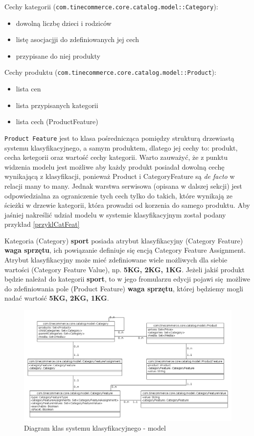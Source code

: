 \noindent Cechy kategorii (\texttt{com.tinecommerce.core.catalog.model::Category}):
\begin{itemize}
	\item dowolną liczbę dzieci i rodziców
	\item listę asocjacjji do zdefiniowanych jej cech
	\item przypisane do niej produkty
\end{itemize} 
Cechy produktu (\texttt{com.tinecommerce.core.catalog.model::Product}):
\begin{itemize}
	\item lista cen
	\item lista przypisanych kategorii
	\item lista cech (ProductFeature)
\end{itemize}
\texttt{Product Feature} jest to klasa pośrednicząca pomiędzy strukturą drzewiastą systemu klasyfikacyjnego, a samym produktem, dlatego jej cechy to: produkt, cecha ketegorii oraz wartość cechy kategorii. Warto zauważyć, że z punktu widzenia modelu jest możliwe aby każdy produkt posiadał dowolną cechę wynikającą z klasyfikacji, ponieważ Product i CategoryFeature są  \textit{de facto} w relacji many to many. Jednak warstwa serwisowa (opisana w dalszej sekcji) jest odpowiedzialna za ograniczenie tych cech tylko do takich, które wynikają ze ścieżki w drzewie kategorii, która prowadzi od korzenia do samego produktu. Aby jaśniej nakreślić udział modelu w systemie klasyfikacyjnym został podany przykład \ref{przyklCatFeat}
\begin{example}
	\label{przyklCatFeat}
	Kategoria (Category) \textbf{sport} posiada atrybut klasyfikacyjny (Category Feature) \textbf{waga sprzętu}, ich powiązanie definiuje się encją Category Feature Assignment. Atrybut klasyfikacyjny może mieć zdefiniowane wiele możliwych dla siebie wartości (Category Feature Value), np. \textbf{5KG, 2KG, 1KG}. Jeżeli jakiś produkt będzie należał do kategorii \textbf{sport}, to w jego fromularzu edycji pojawi się możliwe do zdefiniowania pole (Product Feature) \textbf{waga sprzętu}, której będziemy mogli nadać wartość \textbf{5KG, 2KG, 1KG}.
\end{example}

\begin{figure}
	\begin{center}
		\includegraphics[scale=0.5,angle=270]{klasy_model_sysKlas.png}
	\end{center}
	\caption{{\color{black}Diagram klas systemu klasyfikacyjnego - model}} \label{klasy_model_sysKlas}
\end{figure}

